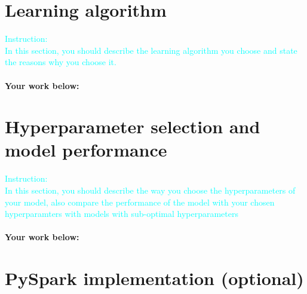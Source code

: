 \documentclass{article}
\begin{document}
\section{Learning algorithm}
\textcolor{cyan}{Instruction: \\
In this section, you should describe the learning algorithm you choose and state the reasons why you choose it.}\\\\
\textbf{Your work below:}\\

\section{Hyperparameter selection and model performance}
\textcolor{cyan}{Instruction: \\
In this section, you should describe the way you choose the hyperparameters of your model, also compare the performance of the model with your chosen hyperparamters with models with sub-optimal hyperparameters}\\\\
\textbf{Your work below:}\\
\section{PySpark implementation (optional)}
\end{document}
